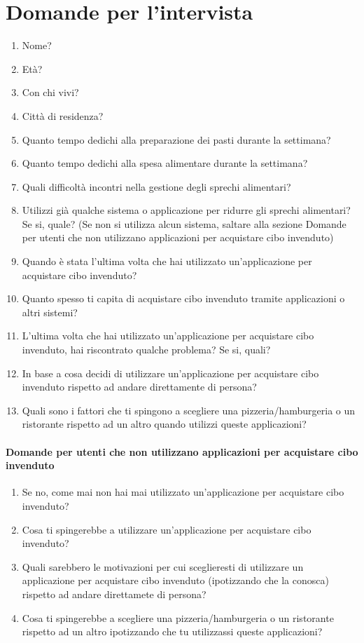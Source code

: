 \documentclass{article}
\begin{document}
\section*{Domande per l'intervista}
\begin{enumerate}
    \item Nome?
    \item Età?
    \item Con chi vivi?
    \item Città di residenza?
    \item Quanto tempo dedichi alla preparazione dei pasti durante la settimana?
    \item Quanto tempo dedichi alla spesa alimentare durante la settimana?
    \item Quali difficoltà incontri nella gestione degli sprechi alimentari?
    \item Utilizzi già qualche sistema o applicazione per ridurre gli sprechi alimentari? Se si, quale? (Se non si utilizza alcun sistema, saltare alla sezione Domande per utenti che non utilizzano applicazioni per acquistare cibo invenduto)
    \item Quando è stata l'ultima volta che hai utilizzato un'applicazione per acquistare cibo invenduto?
    \item Quanto spesso ti capita di acquistare cibo invenduto tramite applicazioni o altri sistemi?
    \item L'ultima volta che hai utilizzato un'applicazione per acquistare cibo invenduto, hai riscontrato qualche problema? Se si, quali?
    \item In base a cosa decidi di utilizzare un'applicazione per acquistare cibo invenduto rispetto ad andare direttamente di persona?
    \item Quali sono i fattori che ti spingono a scegliere una pizzeria/hamburgeria o un ristorante rispetto ad un altro quando utilizzi queste applicazioni?
\end{enumerate}

\paragraph{Domande per utenti che non utilizzano applicazioni per acquistare cibo invenduto}
\begin{enumerate}
    \item Se no, come mai non hai mai utilizzato un'applicazione per acquistare cibo invenduto?
    \item Cosa ti spingerebbe a utilizzare un'applicazione per acquistare cibo invenduto?
    \item Quali sarebbero le motivazioni per cui sceglieresti di utilizzare un applicazione per acquistare cibo invenduto (ipotizzando che la conosca) rispetto ad andare direttamete di persona?
    \item Cosa ti spingerebbe a scegliere una pizzeria/hamburgeria o un ristorante rispetto ad un altro ipotizzando che tu utilizzassi queste applicazioni?
\end{enumerate}
\newpage
\end{document}
